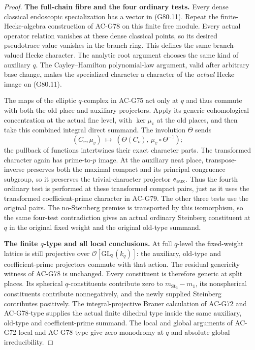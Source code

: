 \begin{proof}
\textbf{The full-chain fibre and the four ordinary tests.}
Every dense classical endoscopic specialization has a vector in
(G80.11).  Repeat the finite-Hecke-algebra construction of AC-G78 on
this finite free module.  Every actual operator relation vanishes at
these dense classical points, so its desired pseudotrace value
vanishes in the branch ring.  This defines the same branch-valued
Hecke character.  The analytic root argument chooses the same kind of
auxiliary \(q\).  The Cayley--Hamilton polynomial-law argument,
valid after arbitrary base change, makes the specialized character a
character of the \emph{actual} Hecke image on (G80.11).

The maps of the elliptic \(q\)-complex in AC-G75 act only at \(q\) and
thus commute with both the old-place and auxiliary projectors.
Apply its generic cohomological concentration at the actual fine level,
with \(\ker\mu_v\) at the old places, and then take this combined
integral direct summand.
The involution \(\Theta\) sends
\[
 (C_v,\mu_v)\ \longmapsto\
 (\Theta(C_v),\,\mu_v\circ\Theta^{-1});             \tag{G80.12}
\]
the pullback of functions intertwines their exact character parts.
The transformed character again has prime-to-\(p\) image.
At the auxiliary neat place, transpose-inverse preserves both the
maximal compact and its principal congruence subgroup, so it preserves
the trivial-character projector \(e_{\rm aux}\).
Thus the fourth ordinary test is performed at these transformed
compact pairs, just as it uses the transformed coefficient-prime
character in AC-G79.  The other three tests use the original pairs.
The no-Steinberg premise is transported by this isomorphism, so the
same four-test contradiction gives an actual ordinary Steinberg
constituent at \(q\) in the original fixed weight and the original
old-type summand.

\textbf{The finite \(q\)-type and all local conclusions.}
At full \(q\)-level the fixed-weight lattice is still projective over
\(\mathcal O[\mathrm{GL}_3(k_q)]\): the auxiliary, old-type and
coefficient-prime projectors commute with that action.
The residual genericity witness of AC-G78 is unchanged.
Every constituent is therefore generic at split places.  Its spherical
\(q\)-constituents contribute zero to
\(m_{\mathrm{St}_3}-m_1\), its nonspherical constituents contribute
nonnegatively, and the newly supplied Steinberg contributes positively.
The integral-projective Brauer calculation of AC-G72 and AC-G78-type
supplies the actual finite dihedral type inside the same auxiliary, old-type and
coefficient-prime summand.
The local and global arguments of AC-G72-local and AC-G78-type give
zero monodromy at \(q\) and absolute global irreducibility.


\end{proof}
